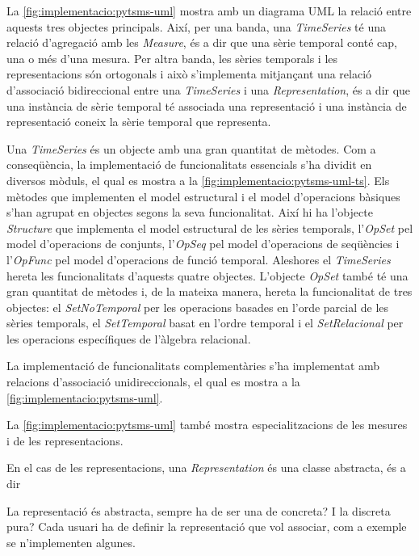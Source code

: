 La \autoref{fig:implementacio:pytsms-uml} mostra amb un diagrama
UML la relació entre aquests tres objectes principals. Així, per una
banda, una \emph{TimeSeries} té una relació d'agregació amb les
\emph{Measure}, és a dir que una sèrie temporal conté cap, una o més
d'una mesura.  Per altra banda, les sèries temporals i les
representacions són ortogonals i això s'implementa mitjançant una
relació d'associació bidireccional entre una \emph{TimeSeries} i una
\emph{Representation}, és a dir que una instància de sèrie temporal té
associada una representació i una instància de representació coneix la
sèrie temporal que representa.




Una \emph{TimeSeries} és un objecte amb una gran quantitat de
mètodes. Com a conseqüència, la implementació de funcionalitats
essencials s'ha dividit en diversos mòduls, el qual es mostra a la
\autoref{fig:implementacio:pytsms-uml-ts}. Els mètodes que implementen
el model estructural i el model d'operacions bàsiques s'han agrupat en
objectes segons la seva funcionalitat. Així hi ha l'objecte
\emph{Structure} que implementa el model estructural de les sèries
temporals, l'\emph{OpSet} pel model d'operacions de conjunts,
l'\emph{OpSeq} pel model d'operacions de seqüències i l'\emph{OpFunc}
pel model d'operacions de funció temporal.  Aleshores el
\emph{TimeSeries} hereta les funcionalitats d'aquests quatre objectes.
L'objecte \emph{OpSet} també té una gran quantitat de mètodes i, de la
mateixa manera, hereta la funcionalitat de tres objectes: el
\emph{SetNoTemporal} per les operacions basades en l'orde parcial de
les sèries temporals, el \emph{SetTemporal} basat en l'ordre temporal
i el \emph{SetRelacional} per les operacions específiques de l'àlgebra
relacional.



La implementació de funcionalitats complementàries s'ha implementat
amb relacions d'associació unidireccionals, el qual es mostra a la
\autoref{fig:implementacio:pytsms-uml}.



La \autoref{fig:implementacio:pytsms-uml} també mostra
especialitzacions de les mesures i de les representacions.




En el cas de les representacions, una \emph{Representation} és una
classe abstracta, és a dir

La representació és abstracta, sempre ha de ser una de concreta? I la discreta pura?
 Cada usuari ha de definir la representació
que vol associar, com a exemple se n'implementen algunes.




